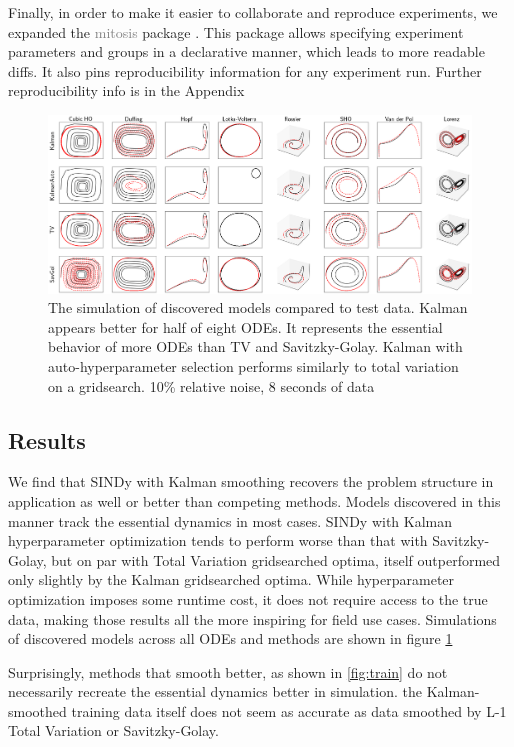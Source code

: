 \documentclass{ACCESS_latex_template_20231118/ieeeaccess}
\newcommand{\gray}[1]{\textcolor{gray}{#1}}
\begin{document}
Finally, in order to make it easier to collaborate and reproduce experiments, we expanded the \gray{mitosis} package \citep{Stevens-Haas_mitosis}.  This package allows specifying experiment parameters and groups in a declarative manner, which leads to more readable diffs.  It also pins reproducibility information for any experiment run.  Further reproducibility info is in the Appendix
\begin{figure}[h]
    \label{fig:test}
    \includegraphics[width=\textwidth]{images/summary_test}
    \caption{The simulation of discovered models compared to test data.  Kalman appears better for half of eight ODEs.  It represents the essential behavior of more ODEs than TV and Savitzky-Golay.  Kalman with auto-hyperparameter selection performs similarly to total variation on a gridsearch.  10\% relative noise, 8 seconds of data}
\end{figure}

\subsection{Results}

We find that SINDy with Kalman smoothing recovers the problem structure in application as well or better than competing methods.
Models discovered in this manner track the essential dynamics in most cases.  SINDy with Kalman hyperparameter optimization tends to perform worse than that with Savitzky-Golay, but on par with Total Variation gridsearched optima, itself outperformed only slightly by the Kalman gridsearched optima.
While hyperparameter optimization imposes some runtime cost, it does not require access to the true data, making those results all the more inspiring for field use cases.
Simulations of discovered models across all ODEs and methods are shown in figure \ref{fig:test}

Surprisingly, methods that smooth better, as shown in \ref{fig:train} do not necessarily recreate the essential dynamics better in simulation. the Kalman-smoothed training data itself does not seem as accurate as data smoothed by L-1 Total Variation or Savitzky-Golay.
\end{document}
